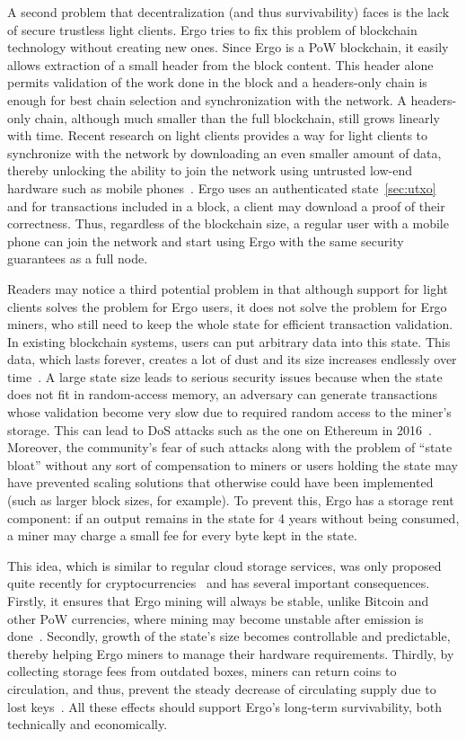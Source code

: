 A second problem that decentralization (and thus survivability) faces is the lack of secure trustless light clients. Ergo tries to fix this problem of blockchain technology without creating new ones. Since Ergo is a PoW blockchain, it easily allows extraction of a small header from the block content.
This header alone permits validation of the work done in the block and a headers-only chain is enough for best chain selection and synchronization with the network.
A headers-only chain, although much smaller than the full blockchain, still grows linearly with time.
Recent research on light clients provides a way for light clients to synchronize with the network by downloading an even smaller amount of data, thereby unlocking the ability to join the network using untrusted low-end hardware such as mobile phones~\cite{kiayias2017non,luuflyclient}.
Ergo uses an authenticated state~\ref{sec:utxo} and for transactions included in a block, a client may download a proof of their correctness.
Thus, regardless of the blockchain size, a regular user with
a mobile phone can join the network and start using Ergo with the same security
guarantees as a full node.

Readers may notice a third potential problem in that although support for light clients solves the problem for Ergo users, it does not solve the problem for Ergo miners, who still need to keep the whole state for efficient transaction validation.
In existing blockchain systems, users can put arbitrary data into this state. This data, which lasts forever, creates a lot of dust and its size increases endlessly over time~\cite{perez2019another}.
A large state size leads to serious security issues because when the state does not fit in random-access memory, an adversary can generate transactions whose validation become very slow due to required random access to the miner's storage. This can lead to DoS attacks such as the one on Ethereum in 2016~\cite{ethDos2016}.
Moreover, the community's fear of such attacks along with the problem of ``state bloat'' without any sort of compensation to miners or users holding the state may have prevented scaling solutions that otherwise
could have been implemented (such as larger block sizes, for example).
To prevent this, Ergo has a storage rent component: if an
output remains in the state for 4 years without being consumed, a miner may charge a small fee for every
byte kept in the state.

This idea, which is similar to regular cloud storage services, was only proposed quite recently for cryptocurrencies~\cite{chepurnoy2017space} and has several important consequences.
Firstly, it ensures that Ergo mining will always be stable, unlike Bitcoin and other PoW currencies, where mining may become unstable after emission is done~\cite{carlsten2016instability}.
Secondly, growth of the state's size becomes controllable and predictable, thereby helping Ergo miners to manage their hardware requirements.
Thirdly, by collecting storage fees from outdated boxes, miners can return coins to circulation, and thus, prevent the steady decrease of circulating supply due to lost keys~\cite{wsj2018}.
All these effects should support Ergo's long-term survivability, both technically and economically.

